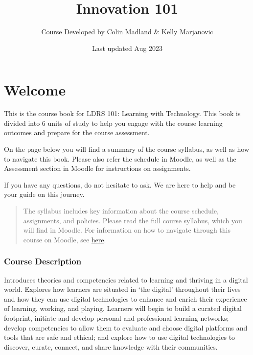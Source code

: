 \documentclass[
]{book}
\title{Innovation 101}
\author{Course Developed by Colin Madland \& Kelly Marjanovic}
\date{Last updated Aug 2023}
\theoremstyle{definition}
\theoremstyle{definition}
\theoremstyle{definition}
\theoremstyle{definition}
\theoremstyle{remark}
\begin{document}
\maketitle

{
\setcounter{tocdepth}{1}
\tableofcontents
}
\hypertarget{welcome}{%
\chapter*{Welcome}\label{welcome}}

This is the course book for LDRS 101: Learning with Technology. This book is divided into 6 units of study to help you engage with the course learning outcomes and prepare for the course assessment.

On the page below you will find a summary of the course syllabus, as well as how to navigate this book. Please also refer the schedule in Moodle, as well as the Assessment section in Moodle for instructions on assignments.

If you have any questions, do not hesitate to ask. We are here to help and be your guide on this journey.

\begin{quote}
The syllabus includes key information about the course schedule, assignments, and policies. Please read the full course syllabus, which you will find in Moodle. For information on how to navigate through this course on Moodle, see \href{https://trinitywestern.teamdynamix.com/TDClient/1904/Portal/KB/?CategoryID=8214}{here}.
\end{quote}

\hypertarget{course-description}{%
\subsection*{Course Description}\label{course-description}}

Introduces theories and competencies related to learning and thriving in a digital world. Explores how learners are situated in `the digital' throughout their lives and how they can use digital technologies to enhance and enrich their experience of learning, working, and playing. Learners will begin to build a curated digital footprint, initiate and develop personal and professional learning networks; develop competencies to allow them to evaluate and choose digital platforms and tools that are safe and ethical; and explore how to use digital technologies to discover, curate, connect, and share knowledge with their communities.
\end{document}
